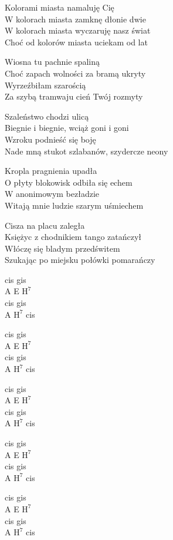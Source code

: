 \begin{text}
    Kolorami miasta namaluję Cię\\
    W kolorach miasta zamknę dłonie dwie\\
    W kolorach miasta wyczaruję nasz świat\\
    Choć od kolorów miasta uciekam od lat

    Wiosna tu pachnie spaliną\\
    Choć zapach wolności za bramą ukryty\\
    Wyrzeźbiłam szarością\\
    Za szybą tramwaju cień Twój rozmyty

    Szaleństwo chodzi ulicą\\
    Biegnie i biegnie, wciąż goni i goni\\
    Wzroku podnieść się boję\\
    Nade mną stukot szlabanów, szydercze neony

    Kropla pragnienia upadła\\
    O płyty blokowisk odbiła się echem\\
    W anonimowym bezładzie\\
    Witają mnie ludzie szarym uśmiechem

    Cisza na placu zaległa\\
    Księżyc z chodnikiem tango zatańczył\\
    Włóczę się bladym przedświtem\\
    Szukając po miejsku połówki pomarańczy
\end{text}
\begin{chord}
    cis gis\\
    A E $\mathrm{H^{7}}$\\
    cis gis\\
    A $\mathrm{H^{7}}$ cis

    cis gis\\
    A E $\mathrm{H^{7}}$\\
    cis gis\\
    A $\mathrm{H^{7}}$ cis

    cis gis\\
    A E $\mathrm{H^{7}}$\\
    cis gis\\
    A $\mathrm{H^{7}}$ cis

    cis gis\\
    A E $\mathrm{H^{7}}$\\
    cis gis\\
    A $\mathrm{H^{7}}$ cis

    cis gis\\
    A E $\mathrm{H^{7}}$\\
    cis gis\\
    A $\mathrm{H^{7}}$ cis
\end{chord}
